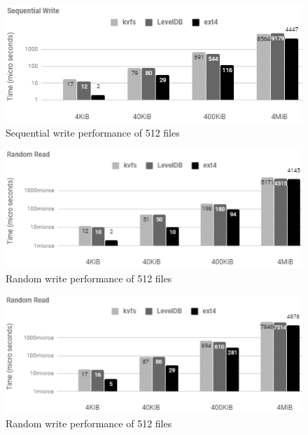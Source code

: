 \documentclass[bsc,frontabs,twoside,singlespacing,parskip,deptreport]{infthesis}     %
\begin{document}
{\begin{figure}[h!]
	\centering
	\includegraphics[scale=1]{diagrams/seq_write.png}
	\caption{Sequential write performance of 512 files}
	 \label{fig:seq_write}
\end{figure}

\begin{figure}[h!]
	\centering
	\includegraphics[scale=1]{diagrams/rand_read.png}
	\caption{Random write performance of 512 files}
	 \label{fig:rand_read}
\end{figure}
\begin{figure}[h!]
	\centering
	\includegraphics[scale=1]{diagrams/rand_write.png}
	\caption{Random write performance of 512 files}
	 \label{fig:rand_write}
\end{figure}

}
\end{document}
